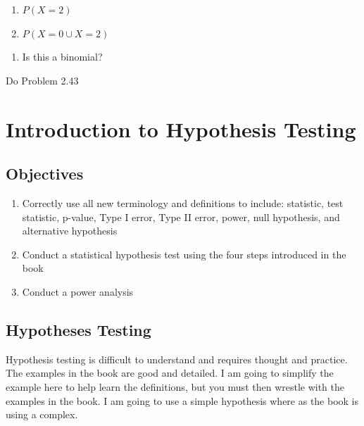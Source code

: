\documentclass[]{book}
\providecommand{\tightlist}{%
  \setlength{\itemsep}{0pt}\setlength{\parskip}{0pt}}
\theoremstyle{definition}
\theoremstyle{definition}
\theoremstyle{definition}
\theoremstyle{remark}
\begin{document}
\begin{enumerate}
\def\labelenumi{\roman{enumi}.}
\tightlist
\item
  \(P(X=2)\)\\
\item
  \(P(X=0 \cup X=2)\)\\
\end{enumerate}

\begin{enumerate}
\def\labelenumi{\arabic{enumi}.}
\setcounter{enumi}{5}
\tightlist
\item
  Is this a binomial?
\end{enumerate}

Do Problem 2.43

\hypertarget{L8}{\section{Introduction to Hypothesis Testing}\label{L8}}

\subsection{Objectives}\label{objectives-7}

\begin{enumerate}
\def\labelenumi{\arabic{enumi}.}
\tightlist
\item
  Correctly use all new terminology and definitions to include:
  statistic, test statistic, p-value, Type I error, Type II error,
  power, null hypothesis, and alternative hypothesis\\
\item
  Conduct a statistical hypothesis test using the four steps introduced
  in the book\\
\item
  Conduct a power analysis
\end{enumerate}

\subsection{Hypotheses Testing}\label{hypotheses-testing}

Hypothesis testing is difficult to understand and requires thought and
practice. The examples in the book are good and detailed. I am going to
simplify the example here to help learn the definitions, but you must
then wrestle with the examples in the book. I am going to use a simple
hypothesis where as the book is using a complex.
\end{document}
